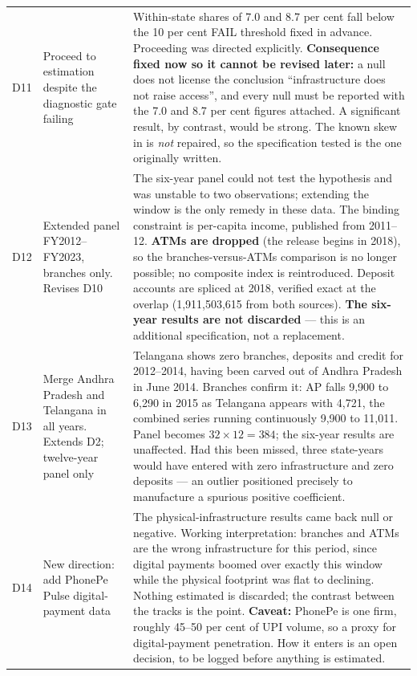 {\begin{longtable}{@{}p{0.7cm}p{3.1cm}p{10.5cm}@{}}
D11 & Proceed to estimation despite the diagnostic gate failing &
Within-state shares of 7.0 and 8.7 per cent fall below the 10 per cent FAIL threshold fixed in
advance. Proceeding was directed explicitly. \textbf{Consequence fixed now so it cannot be revised
later:} a null does not license the conclusion ``infrastructure does not raise access'', and every
null must be reported with the 7.0 and 8.7 per cent figures attached. A significant result, by
contrast, would be strong. The known skew in \Usage{} is \emph{not} repaired, so the specification
tested is the one originally written. \\
\addlinespace

D12 & Extended panel FY2012--FY2023, branches only. Revises D10 &
The six-year panel could not test the hypothesis and was unstable to two observations; extending the window is the only remedy in these data. The binding constraint is per-capita income, published from 2011--12. \textbf{ATMs are dropped} (the release begins in 2018), so the branches-versus-ATMs comparison is no longer possible; no composite index is reintroduced. Deposit accounts are spliced at 2018, verified exact at the overlap (1,911,503,615 from both sources). \textbf{The six-year results are not discarded} --- this is an additional specification, not a replacement. \\
\addlinespace

D13 & Merge Andhra Pradesh and Telangana in all years. Extends D2; twelve-year panel only &
Telangana shows zero branches, deposits and credit for 2012--2014, having been carved out of Andhra Pradesh in June 2014. Branches confirm it: AP falls 9,900 to 6,290 in 2015 as Telangana appears with 4,721, the combined series running continuously 9,900 to 11,011. Panel becomes $32 \times 12 = 384$; the six-year results are unaffected. Had this been missed, three state-years would have entered with zero infrastructure and zero deposits --- an outlier positioned precisely to manufacture a spurious positive coefficient. \\
\addlinespace

D14 & New direction: add PhonePe Pulse digital-payment data &
The physical-infrastructure results came back null or negative. Working interpretation: branches and ATMs are the wrong infrastructure for this period, since digital payments boomed over exactly this window while the physical footprint was flat to declining. Nothing estimated is discarded; the contrast between the tracks is the point. \textbf{Caveat:} PhonePe is one firm, roughly 45--50 per cent of UPI volume, so a proxy for digital-payment penetration. How it enters is an open decision, to be logged before anything is estimated. \\


\end{longtable}}
